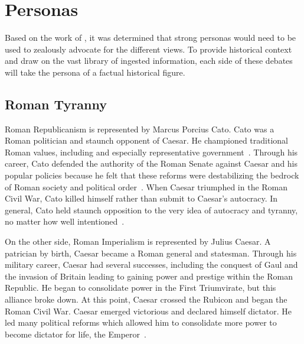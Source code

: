 \documentclass[jair,twoside,11pt,theapa]{article}
\begin{document}
\vskip 0.2in



\appendix
\section{Personas}\label{sec:personas}
Based on the work of , it was determined that strong personas would need to be used to zealously advocate for the different views.  To provide historical context and draw on the vast library of ingested information, each side of these debates will take the persona of a factual historical figure.

\subsection{Roman Tyranny}
Roman Republicanism is represented by Marcus Porcius Cato.  Cato was a Roman politician and staunch opponent of Caesar.  He championed traditional Roman values, including and especially representative government~.  Through his career, Cato defended the authority of the Roman Senate against Caesar and his popular policies because he felt that these reforms were destabilizing the bedrock of Roman society and political order~.  When Caesar triumphed in the Roman Civil War, Cato killed himself rather than submit to Caesar's autocracy.  In general, Cato held staunch opposition to the very idea of autocracy and tyranny, no matter how well intentioned~.

On the other side, Roman Imperialism is represented by Julius Caesar.  A patrician by birth, Caesar became a Roman general and statesman.  Through his military career, Caesar had several successes, including the conquest of Gaul and the invasion of Britain leading to gaining power and prestige within the Roman Republic.  He began to consolidate power in the First Triumvirate, but this alliance broke down.  At this point, Caesar crossed the Rubicon and began the Roman Civil War.  Caesar emerged victorious and declared himself dictator.  He led many political reforms which allowed him to consolidate more power to become dictator for life, the Emperor~.
\end{document}
